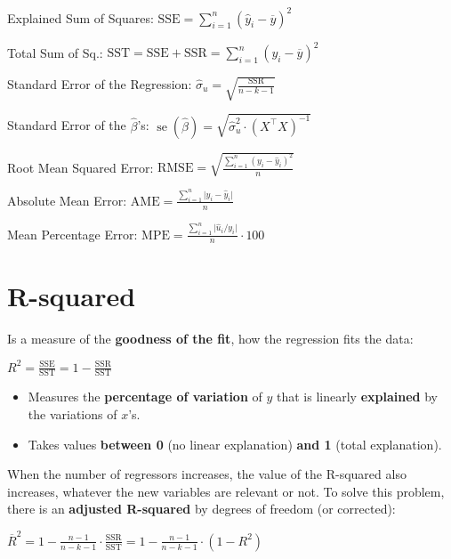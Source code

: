 \documentclass[10pt, a4paper, landscape]{article}
\DeclareMathOperator{\se}{se}
\newcommand{\SSR}{\text{SSR}}
\newcommand{\SSE}{\text{SSE}}
\newcommand{\SST}{\text{SST}}
\begin{document}
\begin{multicols}{3}
Explained Sum of Squares: \hfill \( \SSE = \sum_{i = 1}^{n} (\hat{y}_{i} - \overline{y})^{2} \)

Total Sum of Sq.: \hfill \( \SST = \SSE + \SSR = \sum_{i = 1}^{n} (y_{i} - \overline{y})^{2} \)

Standard Error of the Regression: \hfill \( \hat{\sigma}_{u} = \sqrt{\frac{\SSR}{n - k - 1}} \)

Standard Error of the \( \hat{\beta} \)'s: \hfill \( \se(\hat{\beta}) = \sqrt{\hat{\sigma}_{u}^{2} \cdot (X^{\top} X)^{-1}} \)

Root Mean Squared Error: \hfill \( \text{RMSE} = \sqrt{\frac{\sum_{i = 1}^{n} (y_{i} - \hat{y}_{i})^{2}}{n}} \)

Absolute Mean Error: \hfill \( \text{AME} = \frac{\sum_{i = 1}^{n} \lvert y_{i} - \hat{y}_{i} \rvert}{n} \)

Mean Percentage Error: \hfill \( \text{MPE} = \frac{\sum_{i = 1}^{n} \lvert \hat{u}_{i} / y_{i} \rvert}{n} \cdot 100 \)

\columnbreak

\section*{R-squared}

Is a measure of the \textbf{goodness of the fit}, how the regression fits the data:

\begin{center}
	\( R^{2} = \frac{\SSE}{\SST} = 1 - \frac{\SSR}{\SST} \)
\end{center}

\begin{itemize}[leftmargin=*]
	\item Measures the \textbf{percentage of variation} of \( y \) that is linearly \textbf{explained} by the variations of \( x \)'s.
	\item Takes values \textbf{between 0} (no linear explanation) \textbf{and 1} (total explanation).
\end{itemize}

When the number of regressors increases, the value of the R-squared also increases, whatever the new variables are relevant or not. To solve this problem, there is an \textbf{adjusted R-squared} by degrees of freedom (or corrected):

\begin{center}
	\( \overline{R}^{2} = 1 - \frac{n - 1}{n - k - 1} \cdot \frac{\SSR}{\SST} = 1 - \frac{n - 1}{n - k - 1} \cdot (1 - R^{2}) \)
\end{center}


\end{multicols}
\end{document}
